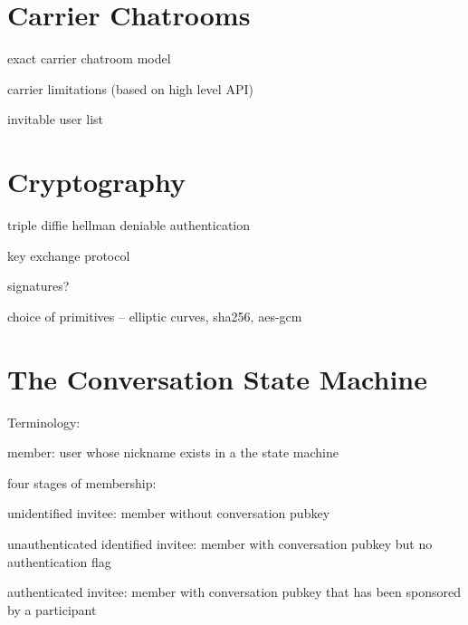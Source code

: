 \documentclass{article}
\begin{document}



\section{Carrier Chatrooms}
\label{sec:carrier-chatrooms}
exact carrier chatroom model

carrier limitations (based on high level API)

invitable user list


\section{Cryptography}
\label{sec:cryptography}
triple diffie hellman deniable authentication

key exchange protocol

signatures?

choice of primitives -- elliptic curves, sha256, aes-gcm


\section{The Conversation State Machine}








Terminology:

member: user whose nickname exists in a the state machine

four stages of membership:

unidentified invitee: member without conversation pubkey

unauthenticated identified invitee: member with conversation pubkey but no authentication flag

authenticated invitee: member with conversation pubkey that has been sponsored by a participant
\end{document}
